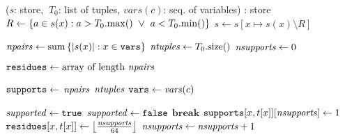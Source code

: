       \PROCEDURE \InitialiseCT($s$: store, %
      $\ T_0$: list of tuples, $\mathit{vars}(c)$: seq. of variables) : store
       \label{line:init:-1} %
          \STATE $R \leftarrow \left\{a \in s(x) : a > T_0.\mathrm{max}()
                 \ \lor \ a < T_0.\mathrm{min}()\right\}$
           \STATE $s \leftarrow s[x \mapsto s(x) \setminus R]$                   
               \RETURN{$\emptyset$} \label{line:init:wipeout0}
          \ENDIF

       \ENDFOREACH \label{line:init:0}

      \STATE $\mathit{npairs} \leftarrow \mathrm{sum}\left\{|s(x)| : x \in \texttt{vars}\right\}$
      \label{line:init:3}
      \STATE $\mathit{ntuples} \leftarrow T_0.\mathrm{size}()$ 
      \STATE $\mathit{nsupports} \leftarrow 0$  \label{line:init:4}
      
      \STATE $\texttt{residues} \leftarrow \text{array of length~} \mathit{npairs}$ \label{line:init:residue}
      
      \STATE $\texttt{supports} \leftarrow$ $\mathit{npairs}$ $\mathit{ntuples}$ \label{line:init:supports}
      \STATE $\texttt{vars} \gets \mathit{vars}(c)$ \label{line:init:vars}       
      

       \label{line:init:6}
        \STATE $\mathit{supported} \leftarrow \texttt{true}$
            \STATE $\mathit{supported} \leftarrow \texttt{false}$
            \STATE $\textbf{break}$ 
          \ENDIF
        \ENDFOREACH
             \label{line:init:9}
              \STATE $\texttt{supports}[x,t[x]][\mathit{nsupports}] \leftarrow 1$ \label{line:init:10}
              \STATE $\texttt{residues}[x,t[x]] \leftarrow \left\lfloor\frac{\mathit{nsupports}}{64}\right\rfloor$
              \label{line:init:11}
              \STATE $\mathit{nsupports} \leftarrow \mathit{nsupports} + 1$ \label{line:init:12}
            \ENDFOREACH
          \ENDIF
      \ENDFOREACH \label{line:init:7}

